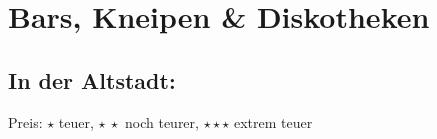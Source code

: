 \newcommand{\place}[4]{\item[(\stepcounter{zahl}\thezahl) #1](#2)\\ #3\\\emph{Preis:} #4}


\section{Bars, Kneipen \& Diskotheken}
\subsection*{In der Altstadt:}
Preis: $\star$ teuer, $\star\ \star$ noch teurer, $\star\star\star$ extrem teuer


